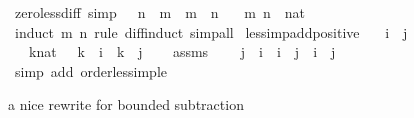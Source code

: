 \begin{isabellebody}
\endisatagproof
{\isafoldproof}%
%
\isadelimproof
\isanewline
%
\endisadelimproof
\isanewline
{}\isamarkupfalse%
\ zero{\isacharunderscore}{\kern0pt}less{\isacharunderscore}{\kern0pt}diff\ {\isacharbrackleft}{\kern0pt}simp{\isacharbrackright}{\kern0pt}{\isacharcolon}{\kern0pt}\ {\isachardoublequoteopen}{}\ {\isacharless}{\kern0pt}\ n\ {\isacharminus}{\kern0pt}\ m\ {\isasymlongleftrightarrow}\ m\ {\isacharless}{\kern0pt}\ n{\isachardoublequoteclose}\isanewline
\ \ \ m\ n\ {\isacharcolon}{\kern0pt}{\isacharcolon}{\kern0pt}\ nat\isanewline
%
\isadelimproof
\ \ %
\endisadelimproof
%
\isatagproof
{}\isamarkupfalse%
\ {\isacharparenleft}{\kern0pt}induct\ m\ n\ rule{\isacharcolon}{\kern0pt}\ diff{\isacharunderscore}{\kern0pt}induct{\isacharparenright}{\kern0pt}\ simp{\isacharunderscore}{\kern0pt}all%
\endisatagproof
{\isafoldproof}%
%
\isadelimproof
\isanewline
%
\endisadelimproof
\isanewline
{}\isamarkupfalse%
\ less{\isacharunderscore}{\kern0pt}imp{\isacharunderscore}{\kern0pt}add{\isacharunderscore}{\kern0pt}positive{\isacharcolon}{\kern0pt}\isanewline
\ \ \ {\isachardoublequoteopen}i\ {\isacharless}{\kern0pt}\ j{\isachardoublequoteclose}\isanewline
\ \ \ {\isachardoublequoteopen}{\isasymexists}k{\isacharcolon}{\kern0pt}{\isacharcolon}{\kern0pt}nat{\isachardot}{\kern0pt}\ {}\ {\isacharless}{\kern0pt}\ k\ {\isasymand}\ i\ {\isacharplus}{\kern0pt}\ k\ {\isacharequal}{\kern0pt}\ j{\isachardoublequoteclose}\isanewline
%
\isadelimproof
%
\endisadelimproof
%
\isatagproof
{}\isamarkupfalse%
\isanewline
\ \ \isamarkupfalse%
\ assms\ \isamarkupfalse%
\ {\isachardoublequoteopen}{}\ {\isacharless}{\kern0pt}\ j\ {\isacharminus}{\kern0pt}\ i\ {\isasymand}\ i\ {\isacharplus}{\kern0pt}\ {\isacharparenleft}{\kern0pt}j\ {\isacharminus}{\kern0pt}\ i{\isacharparenright}{\kern0pt}\ {\isacharequal}{\kern0pt}\ j{\isachardoublequoteclose}\isanewline
\ \ \ \ \isamarkupfalse%
\ {\isacharparenleft}{\kern0pt}simp\ add{\isacharcolon}{\kern0pt}\ order{\isacharunderscore}{\kern0pt}less{\isacharunderscore}{\kern0pt}imp{\isacharunderscore}{\kern0pt}le{\isacharparenright}{\kern0pt}\isanewline
{}\isamarkupfalse%
%
\endisatagproof
{\isafoldproof}%
%
\isadelimproof
%
\endisadelimproof
%
\begin{isamarkuptext}%
a nice rewrite for bounded subtraction%
\end{isamarkuptext}\isamarkuptrue%
\isamarkupfalse%

\end{isabellebody}
